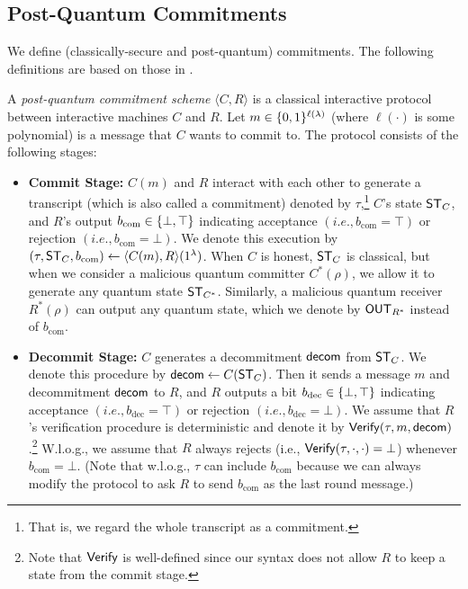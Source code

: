 \subsection{Post-Quantum Commitments}
We define (classically-secure and post-quantum) commitments. The following definitions are based on those in \cite{C:CCLY22}. 
\begin{definition}\label{def:com}
A {\em post-quantum commitment scheme}  $\langle C, R \rangle$ is a classical interactive protocol between interactive \PPT machines $C$ and $R$. Let $m\in \{0,1\}^{\ell(\lambda)}$ (where $\ell(\cdot)$ is some polynomial) is a message that $C$ wants to commit to. The protocol consists of the following stages:
\begin{itemize}
\item
{\bf Commit Stage:} $C(m)$ and $R$ interact with each other to generate a transcript (which is also called a commitment) denoted by $\tau$,\footnote{That is, we regard the whole transcript as a commitment.} 
$C$'s state $\mathsf{ST}_{C}$, and 
$R$'s output $b_{\mathrm{com}}\in\{\bot,\top\}$ indicating acceptance $(i.e., b_{\mathrm{com}}=\top)$ 
or rejection $(i.e., b_{\mathrm{com}}=\bot)$.
 We denote this execution by $(\tau,\mathsf{ST}_{C},b_{\mathrm{com}}) \gets \langle C(m), R \rangle(1^\lambda)$. When $C$ is honest, $\mathsf{ST}_C$ is classical, but when we consider a malicious quantum committer $C^*(\rho)$, we allow it to generate any quantum state $\mathsf{ST}_{C^*}$. 
 Similarly, a malicious quantum receiver $R^*(\rho)$ can output any quantum state, which we denote by $\mathsf{OUT}_{R^*}$ instead of $b_{\mathrm{com}}$. 
\item
{\bf Decommit Stage:}
$C$ generates a decommitment $\mathsf{decom}$ from $\mathsf{ST}_C$.
We denote this procedure by $\mathsf{decom} \gets C(\mathsf{ST}_C)$. 
Then it sends a message $m$ and decommitment $\mathsf{decom}$ to $R$, 
and $R$ outputs a bit
$b_{\mathrm{dec}}\in\{\bot, \top\}$ indicating acceptance $(i.e., b_{\mathrm{dec}}=\top)$ 
or rejection $(i.e., b_{\mathrm{dec}}=\bot)$.
We assume that $R$'s verification procedure is deterministic and denote it
by $\mathsf{Verify}(\tau,m,\mathsf{decom})$.\footnote{Note that $\mathsf{Verify}$ is well-defined since our syntax does not allow $R$ to keep a state from the commit stage.}
W.l.o.g., we assume that $R$ always rejects (i.e., $\mathsf{Verify}(\tau,\cdot,\cdot) = \bot$) whenever $b_\mathrm{com} = \bot$. (Note that w.l.o.g., $\tau$ can include $b_\mathrm{com}$ because we can always modify the protocol to ask $R$ to send $b_\mathrm{com}$ as the last round message.)
\end{itemize}


\end{definition}
